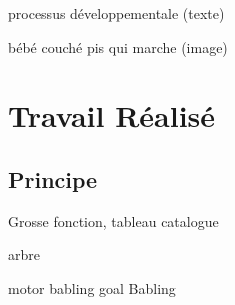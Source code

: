 \documentclass[french]{beamer}
\begin{document}

\begin{frame}

    processus développementale (texte)

    bébé couché pis qui marche (image)
\end{frame}

\section{Travail Réalisé}

\subsection{Principe}

\begin{frame}

    Grosse fonction, tableau catalogue

\end{frame}


\begin{frame}

    arbre

    motor babling     goal Babling
    



\end{frame}
\end{document}
